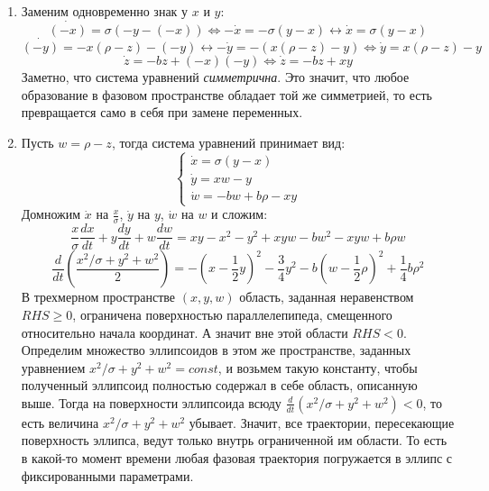 \documentclass[12pt]{article}
\begin{document}
\begin{enumerate}
\item Заменим одновременно знак у $x$ и $y$:
\begin{equation*}
\dot{(-x)} = \sigma(-y-(-x)) \Leftrightarrow -\dot{x}=-\sigma(y-x) \leftrightarrow \dot{x}=\sigma(y-x)
\end{equation*}
\begin{equation*}
\dot{(-y)} = -x(\rho-z)-(-y) \leftrightarrow -\dot{y}=-(x(\rho-z)-y) \Leftrightarrow \dot{y}=x(\rho-z)-y
\end{equation*}
\begin{equation*}
\dot{z} = -bz+(-x)(-y) \Leftrightarrow \dot{z}=-bz+xy
\end{equation*}
Заметно, что система уравнений \textit{симметрична}. Это значит, что любое образование в фазовом пространстве обладает той же симметрией, то есть превращается само в себя при замене переменных.

\item Пусть $w=\rho-z$, тогда система уравнений принимает вид:
$$\begin{cases}	
	\dot{x} = \sigma (y-x) \\
	\dot{y} = xw-y \\
	\dot{w} = -bw+b\rho-xy
\end{cases}$$
Домножим $\dot{x}$ на $\frac{x}{\sigma}$, $\dot{y}$ на $y$, $\dot{w}$ на $w$ и сложим:
\begin{equation*}
\frac{x}{\sigma}\frac{dx}{dt}+y\frac{dy}{dt}+w\frac{dw}{dt}=xy-x^2-y^2+xyw-bw^2-xyw+b\rho w
\end{equation*}
\begin{equation*}
\frac{d}{dt}\left(\frac{x^2/\sigma+y^2+w^2}{2}\right)=-\left(x-\frac{1}{2}y\right)^2-\frac{3}{4}y^2-b\left(w-\frac{1}{2}\rho\right)^2+\frac{1}{4}b\rho^2
\end{equation*}
В трехмерном пространстве $(x, y, w)$ область, заданная неравенством $RHS \geqslant 0$, ограничена поверхностью параллелепипеда, смещенного относительно начала координат. А значит вне этой области $RHS < 0$.
Определим множество эллипсоидов в этом же пространстве, заданных уравнением $x^2/\sigma+y^2+w^2=const$, и возьмем такую константу, чтобы полученный эллипсоид полностью содержал в себе область, описанную выше. Тогда на поверхности эллипсоида всюду $\frac{d}{dt}(x^2/\sigma+y^2+w^2) < 0$, то есть величина $x^2/\sigma+y^2+w^2$ убывает. Значит, все траектории, пересекающие поверхность эллипса, ведут только внутрь ограниченной им области. То есть в какой-то момент времени любая фазовая траектория погружается в эллипс с фиксированными параметрами.


\end{enumerate}
\end{document}

